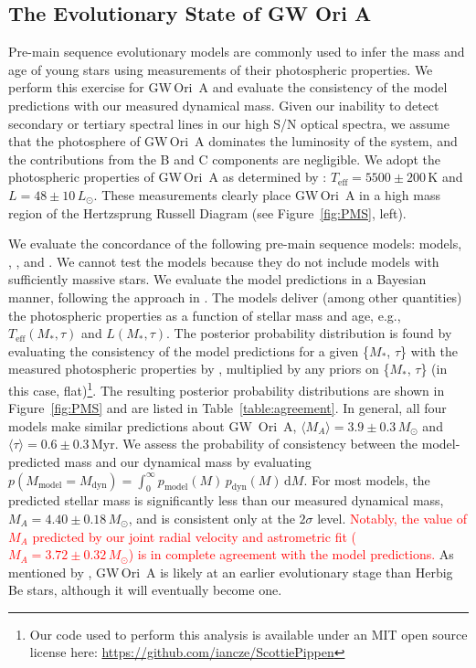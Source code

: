 \documentclass[twocolumn]{aastex61}
\newcommand{\todo}[1]{ \textcolor{red}{#1}}
\newcommand{\gw}{GW\,Ori}
\begin{document}
\subsection{The Evolutionary State of GW Ori A}
Pre-main sequence evolutionary models are commonly used to infer the mass and age of young stars using measurements of their photospheric properties. We perform this exercise for \gw~A and evaluate the consistency of the model predictions with our measured dynamical mass. Given our inability to detect secondary or tertiary spectral lines in our high S/N optical spectra, we assume that the photosphere of \gw~A dominates the luminosity of the system, and the contributions from the B and C components are negligible. We adopt the photospheric properties of \gw~A as determined by \citet{fang14}: $T_\mathrm{eff} = 5500 \pm 200\,\mathrm{K}$ and $L = 48 \pm 10\,L_\odot$. These measurements clearly place \gw~A in a high mass region of the Hertzsprung Russell Diagram (see Figure~\ref{fig:PMS}, left).

We evaluate the concordance of the following pre-main sequence models: \citet{choi16} models, \citet{dotter08}, \citet{tognelli11}, and \citet{siess00}. We cannot test the \citet{baraffe15} models because they do not include models with sufficiently massive stars. We evaluate the model predictions in a Bayesian manner, following the approach in \citet{jorgensen05,rosenfeld12b,czekala15a}. The models deliver (among other quantities) the photospheric properties as a function of stellar mass and age,
e.g., $T_\mathrm{eff}(M_\ast, \tau)$ and $L(M_\ast, \tau)$.
The posterior probability distribution is found by evaluating the consistency of the model predictions for a given \{$M_\ast$, $\tau$\} with the measured photospheric properties by \citet{fang14}, multiplied by any priors on  \{$M_\ast$, $\tau$\} (in this case, flat)\footnote{Our code used to perform this analysis is available under an MIT open source license here: \url{https://github.com/iancze/ScottiePippen}}.
The resulting posterior probability distributions are shown in Figure~\ref{fig:PMS} and are listed in Table~\ref{table:agreement}. In general, all four models make similar predictions about GW~Ori~A, $\langle M_A \rangle = 3.9 \pm 0.3\,M_\odot$ and $\langle \tau \rangle = 0.6 \pm 0.3\,$Myr. We assess the probability of consistency between the model-predicted mass and our dynamical mass by evaluating $p(M_\mathrm{model} = M_\mathrm{dyn}) = \int_0^\infty p_\mathrm{model}(M) \, p_\mathrm{dyn}(M) \, \mathrm{d}M$. For most models, the predicted stellar mass is significantly less than our measured dynamical mass, $M_A = 4.40 \pm 0.18\,M_\odot$, and is consistent only at the $2\sigma$ level. \todo{Notably, the value of $M_A$ predicted by our joint radial velocity and astrometric fit ($M_A = 3.72 \pm 0.32\,M_\odot$) is in complete agreement with the model predictions.} As mentioned by \citet{fang14}, \gw~A is likely at an earlier evolutionary stage than Herbig Be stars, although it will eventually become one.
\end{document}
